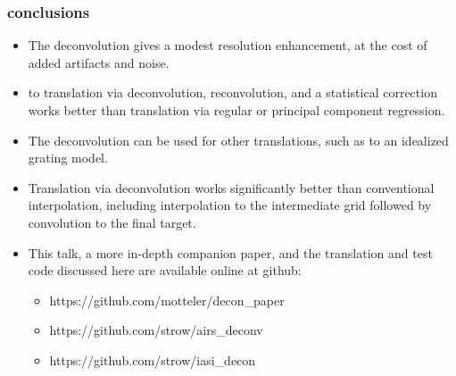 \documentclass[10pt]{beamer}
\begin{document}
\begin{frame}
\frametitle{conclusions}
\begin{itemize}

  \item The {\airs} deconvolution gives a modest resolution
    enhancement, at the cost of added artifacts and noise.

  \item {\airs} to {\cris} translation via deconvolution,
    reconvolution, and a statistical correction works better than
    translation via regular or principal component regression.

  \item The deconvolution can be used for other translations, such
    as to an idealized grating model.

  \item Translation via deconvolution works significantly better
    than conventional interpolation, including interpolation to the
    intermediate grid followed by convolution to the final target.

  \item This talk, a more in-depth companion paper, and the
    translation and test code discussed here are available online at
    github:
    \begin{itemize}
      \item https://github.com/motteler/decon\_paper
      \item https://github.com/strow/airs\_deconv
      \item https://github.com/strow/iasi\_decon
    \end{itemize}

\end{itemize}
\end{frame}
\end{document}
